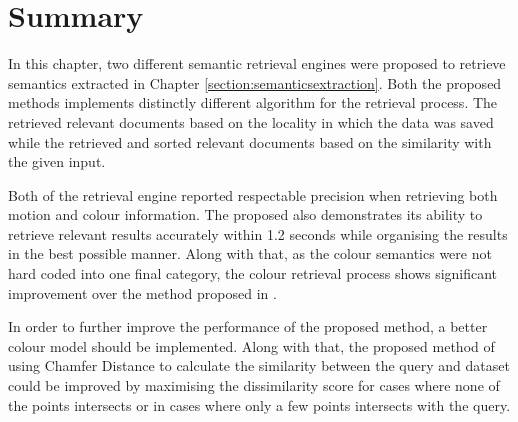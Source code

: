 \section{Summary}

In this chapter, two different semantic retrieval engines were proposed to
retrieve semantics extracted in Chapter \ref{section:semanticsextraction}.
Both the proposed methods implements distinctly different algorithm for the
retrieval process. The \versionOneRet retrieved relevant documents based on the
locality in which the data was saved while the \versionTwoRet retrieved and
sorted relevant documents based on the similarity with the given input.

Both of the retrieval engine reported respectable precision when retrieving
both motion and colour information. The proposed \versionTwoRet also
demonstrates its ability to retrieve relevant results accurately within 1.2
seconds while organising the results in the best possible manner. Along with
that, as the colour semantics were not hard coded into one final category,
the colour retrieval process shows significant improvement over the method
proposed in \versionOneRet.

In order to further improve the performance of the proposed method, a better
colour model should be implemented. Along with that, the proposed method of
using Chamfer Distance to calculate the similarity between the query and dataset
could be improved by maximising the dissimilarity score for cases where none of
the points intersects or in cases where only a few points intersects with the
query.

